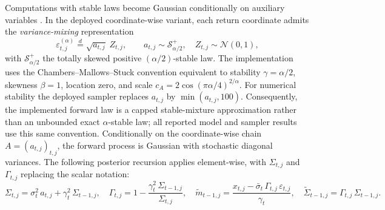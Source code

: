 ﻿\documentclass[12pt,letterpaper]{article}
\begin{document}
Computations with stable laws become Gaussian conditionally on auxiliary
variables \citep{samorodnitsky1994stable}. In the deployed coordinate-wise
variant, each return coordinate admits the \emph{variance-mixing}
representation
\begin{equation}
\varepsilon^{(\alpha)}_{t,j} \overset{d}{=} \sqrt{a_{t,j}}\; Z_{t,j},
\qquad
a_{t,j} \sim \mathcal{S}_{\alpha/2}^{+},\quad Z_{t,j}\sim\mathcal{N}(0,1),
\label{eq:mixing}
\end{equation}
with $\mathcal{S}_{\alpha/2}^{+}$ the totally skewed positive
$(\alpha/2)$-stable law. The implementation uses the
Chambers--Mallows--Stuck convention equivalent to stability
$\gamma=\alpha/2$, skewness $\beta=1$, location zero, and scale
$c_A=2\cos(\pi\alpha/4)^{2/\alpha}$. For numerical stability the deployed
sampler replaces $a_{t,j}$ by $\min(a_{t,j},100)$. Consequently, the
implemented forward law is a capped stable-mixture approximation rather than
an unbounded exact $\alpha$-stable law; all reported model and sampler results
use this same convention. Conditionally on the coordinate-wise chain
$A=(a_{t,j})_{t,j}$, the forward process is Gaussian with stochastic diagonal
variances. The following posterior recursion applies element-wise, with
$\Sigma_{t,j}$ and $\Gamma_{t,j}$ replacing the scalar notation:
\begin{equation}
\Sigma_{t,j} = \sigma_t^2\, a_{t,j} + \gamma_t^2\, \Sigma_{t-1,j},
\quad
\Gamma_{t,j} = 1 - \frac{\gamma_t^2\,\Sigma_{t-1,j}}{\Sigma_{t,j}},
\quad
\tilde m_{t-1,j} = \frac{x_{t,j} - \bar\sigma_t\,\Gamma_{t,j}\,\varepsilon_{t,j}}{\gamma_t},
\quad
\tilde\Sigma_{t-1,j} = \Gamma_{t,j}\, \Sigma_{t-1,j}.
\label{eq:posterior}
\end{equation}
\end{document}
